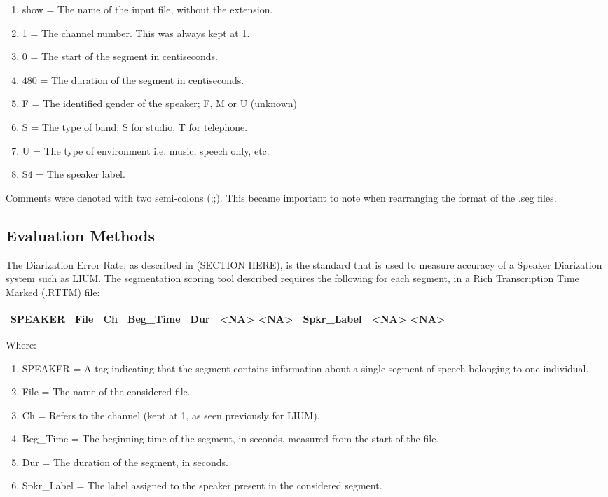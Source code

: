 \begin{enumerate}
\singlespacing
\item{show = The name of the input file, without the extension.}
\item{1 = The channel number. This was always kept at 1.}
\item{0 = The start of the segment in centiseconds.}
\item{480 = The duration of the segment in centiseconds.}
\item{F = The identified gender of the speaker; F, M or U (unknown)}
\item{S = The type of band; S for studio, T for telephone.}
\item{U = The type of environment i.e. music, speech only, etc.}
\item{S4 = The speaker label.}
\end{enumerate}

\doublespacing
\noindent Comments were denoted with two semi-colons (;;). This became important to note when rearranging the format of the .seg files.

\subsection{Evaluation Methods}

\doublespacing
The Diarization Error Rate, as described in (SECTION HERE), is the standard that is used to measure accuracy of a Speaker Diarization system such as LIUM. The segmentation scoring tool described requires the following for each segment, in a Rich Transcription Time Marked (.RTTM) file:

\bgroup
\singlespacing
\def\arraystretch{1.5}
\begin{center}
\begin{tabular}{| c | c | c | c | c | c | c | c |}
\hline
 SPEAKER & File & Ch & Beg\_Time & Dur & <NA> <NA> & Spkr\_Label & <NA> <NA> \\
\hline
\end{tabular}
\end{center}
\egroup

\doublespacing
\noindent Where:

\begin{enumerate}
\singlespacing
\item{SPEAKER = A tag indicating that the segment contains information about a single segment of speech belonging to one individual.}
\item{File = The name of the considered file.}
\item{Ch = Refers to the channel (kept at 1, as seen previously for LIUM).}
\item{Beg\_Time = The beginning time of the segment, in seconds, measured from the start of the file.}
\item{Dur = The duration of the segment, in seconds.}
\item{Spkr\_Label = The label assigned to the speaker present in the considered segment.}
\end{enumerate}

